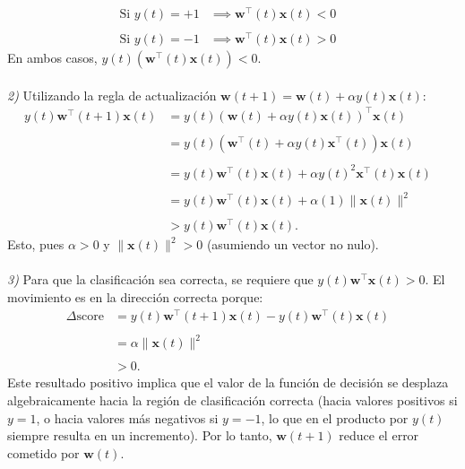 \documentclass{article}
\begin{document}
\begin{align*}
    \text{Si } y(t) = +1 &\implies \mathbf{w}^\top(t)\mathbf{x}(t) < 0 &\\ \\
    \text{Si } y(t) = -1 &\implies \mathbf{w}^\top(t)\mathbf{x}(t) > 0
\end{align*}
En ambos casos, $y(t) \left( \mathbf{w}^\top(t)\mathbf{x}(t) \right) < 0$. \\ \\
\textit{2)} Utilizando la regla de actualización $\mathbf{w}(t+1) = \mathbf{w}(t) + \alpha y(t) \mathbf{x}(t)$:
\begin{align*}
    y(t) \mathbf{w}^\top(t+1) \mathbf{x}(t) &= y(t) \left( \mathbf{w}(t) + \alpha y(t) \mathbf{x}(t) \right)^\top \mathbf{x}(t) &\\ \\
    &= y(t) \left( \mathbf{w}^\top(t) + \alpha y(t) \mathbf{x}^\top(t) \right) \mathbf{x}(t) &\\ \\
    &= y(t) \mathbf{w}^\top(t) \mathbf{x}(t) + \alpha y(t)^2 \mathbf{x}^\top(t) \mathbf{x}(t) &\\ \\
    &= y(t) \mathbf{w}^\top(t) \mathbf{x}(t) + \alpha (1) \|\mathbf{x}(t)\|^2 &\\ \\
    &> y(t) \mathbf{w}^\top(t) \mathbf{x}(t).
\end{align*}
Esto, pues $\alpha > 0$ y $\|\mathbf{x}(t)\|^2 > 0$ (asumiendo un vector no nulo). \\ \\
\textit{3)} Para que la clasificación sea correcta, se requiere que $y(t) \mathbf{w}^\top \mathbf{x}(t) > 0$. El movimiento es en la dirección correcta porque:
\begin{align*}
    \Delta \text{score} &= y(t) \mathbf{w}^\top(t+1) \mathbf{x}(t) - y(t) \mathbf{w}^\top(t) \mathbf{x}(t) &\\ \\
    &= \alpha \|\mathbf{x}(t)\|^2 &\\ \\
    &> 0.
\end{align*}
Este resultado positivo implica que el valor de la función de decisión se desplaza algebraicamente hacia la región de clasificación correcta (hacia valores positivos si $y=1$, o hacia valores más negativos si $y=-1$, lo que en el producto por $y(t)$ siempre resulta en un incremento). Por lo tanto, $\mathbf{w}(t+1)$ reduce el error cometido por $\mathbf{w}(t)$.
\end{document}
